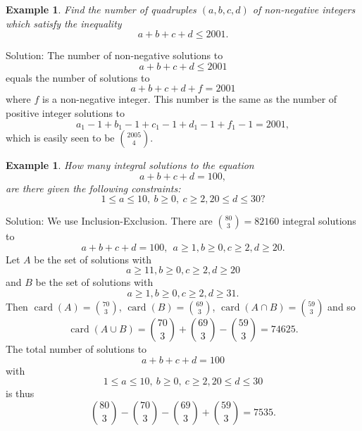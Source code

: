 \documentclass[11pt, openany]{book}
\theoremstyle{change} \theoremheaderfont{\blue\sffamily\bfseries}
\newtheorem{exa}[thm]{Example}
\theoremstyle{nonumberplain} \theoremheaderfont{\sffamily\bfseries}
\def\binom#1#2{{#1\choose#2}}
\newcommand{\í}{\'{\i}}
\def\card#1{\operatorname{card}\left(#1\right)}
\begin{document}
\begin{exa}Find the
number of quadruples $(a, b, c, d)$ of non-negative integers which
satisfy the inequality
$$a + b + c + d \leq 2001.$$\end{exa}
Solution: The number of non-negative solutions to $$a + b + c + d
\leq 2001$$ equals the number of solutions to $$a + b + c + d + f =
2001$$where $f$ is a non-negative integer. This number is the same
as the number of positive integer solutions to $$a_1 - 1 + b_1 - 1 +
c_1 - 1 + d_1 - 1 + f_1 - 1 =  2001,$$ which is easily seen to be
$\binom{2005}{4}$.
\begin{exa}\item How many integral solutions to the equation
$$a + b + c + d = 100,$$are there given the following
constraints:
$$1 \leq a \leq 10,\ b \geq 0, \ c \geq 2, 20 \leq d \leq 30 ?$$
\end{exa}Solution: We use Inclusion-Exclusion.
There are $\binom{80}{3} =82160$ integral solutions to $$a + b + c +
d = 100, \ \ a \geq 1, b \geq 0, c \geq 2, d \geq 20.$$ Let $A$ be
the set of solutions with $$ a \geq 11, b \geq 0, c \geq 2, d \geq
20$$ and $B$ be the set of solutions with
$$ a \geq 1, b \geq 0, c \geq 2, d \geq
31.$$ Then $\card{A} = \binom{70}{3}$, $\card{B} = \binom{69}{3}$,
$\card{A \cap B} =  \binom{59}{3}$ and so
$$\card{A \cup B} = \binom{70}{3} + \binom{69}{3} - \binom{59}{3} = 74625.$$
The total number of solutions to
$$a + b + c + d = 100$$with
$$1 \leq a \leq 10,\ b \geq 0, \ c \geq 2, 20 \leq d \leq 30 $$
is thus
$$\binom{80}{3} - \binom{70}{3} - \binom{69}{3} + \binom{59}{3} = 7535.$$
\end{document}
